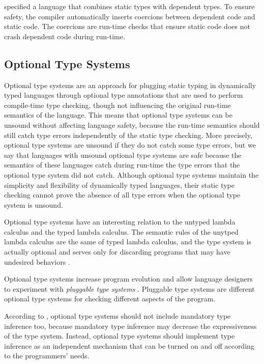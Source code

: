 \documentclass[preprint]{sig-alternate}
\begin{document}
\cite{ou2004dtd} specified a language that combines static types
with dependent types.
To ensure safety, the compiler automatically inserts coercions
between dependent code and static code.
The coercions are run-time checks that ensure static code does not
crash dependent code during run-time.

\subsection{Optional Type Systems}

Optional type systems \cite{bracha2004pluggable} are an approach for
plugging static typing in dynamically typed languages through
optional type annotations that are used to perform compile-time type
checking, though not influencing the original run-time semantics of
the language.
This means that optional type systems can be unsound without affecting
language safety, because the run-time semantics should still catch
type errors independently of the static type checking.
More precisely, optional type systems are unsound if they do not catch
some type errors, but we say that languages with unsound optional type
systems are safe because the semantics of these languages catch during
run-time the type errors that the optional type system did not catch.
Although optional type systems maintain the simplicity and
flexibility of dynamically typed languages, their static type
checking cannot prove the absence of all type errors when the optional
type system is unsound.

Optional type systems have an interesting relation to the untyped
lambda calculus and the typed lambda calculus.
The semantic rules of the unytped lambda calculus are the same of
typed lambda calculus, and the type system is actually optional and
serves only for discarding programs that may have undesired behaviors
\cite{bracha2004pluggable}.

Optional type systems increase program evolution and
allow language designers to experiment with
\textit{pluggable type systems} \cite{bracha2004pluggable}.
Pluggable type systems are different optional type systems for
checking different aspects of the program.

According to \cite{bracha2004pluggable}, optional type systems should
not include mandatory type inference too, because mandatory type
inference may decrease the expressiveness of the type system.
Instead, optional type systems should implement type inference as
an independent mechanism that can be turned on and off according to
the programmers' needs.
\end{document}

